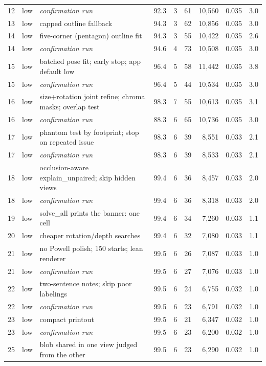 \begin{tabular}{@{}rlp{5.6cm}rrrrrr@{}}
12 & low & \emph{confirmation run} & 92.3 & 3 & 61 & 10,560 & 0.035 & 3.0 \\
13 & low & capped outline fallback & 94.3 & 3 & 62 & 10,856 & 0.035 & 3.0 \\
14 & low & five-corner (pentagon) outline fit & 94.3 & 3 & 55 & 10,422 & 0.035 & 2.6 \\
14 & low & \emph{confirmation run} & 94.6 & 4 & 73 & 10,508 & 0.035 & 3.0 \\
15 & low & batched pose fit; early stop; app default low & 96.4 & 5 & 58 & 11,442 & 0.035 & 3.8 \\
15 & low & \emph{confirmation run} & 96.4 & 5 & 44 & 10,534 & 0.035 & 3.0 \\
16 & low & size+rotation joint refine; chroma masks; overlap test & 98.3 & 7 & 55 & 10,613 & 0.035 & 3.1 \\
16 & low & \emph{confirmation run} & 88.3 & 6 & 65 & 10,736 & 0.035 & 3.0 \\
17 & low & phantom test by footprint; stop on repeated issue & 98.3 & 6 & 39 & 8,551 & 0.033 & 2.1 \\
17 & low & \emph{confirmation run} & 98.3 & 6 & 39 & 8,533 & 0.033 & 2.1 \\
18 & low & occlusion-aware explain\_unpaired; skip hidden views & 99.4 & 6 & 36 & 8,457 & 0.033 & 2.0 \\
18 & low & \emph{confirmation run} & 99.4 & 6 & 36 & 8,318 & 0.033 & 2.0 \\
19 & low & solve\_all prints the banner: one cell & 99.4 & 6 & 34 & 7,260 & 0.033 & 1.1 \\
20 & low & cheaper rotation/depth searches & 99.4 & 6 & 32 & 7,080 & 0.033 & 1.1 \\
21 & low & no Powell polish; 150 starts; lean renderer & 99.5 & 6 & 26 & 7,087 & 0.033 & 1.0 \\
21 & low & \emph{confirmation run} & 99.5 & 6 & 27 & 7,076 & 0.033 & 1.0 \\
22 & low & two-sentence notes; skip poor labelings & 99.5 & 6 & 24 & 6,755 & 0.032 & 1.0 \\
22 & low & \emph{confirmation run} & 99.5 & 6 & 23 & 6,791 & 0.032 & 1.0 \\
23 & low & compact printout & 99.5 & 6 & 21 & 6,347 & 0.032 & 1.0 \\
23 & low & \emph{confirmation run} & 99.5 & 6 & 23 & 6,200 & 0.032 & 1.0 \\
25 & low & blob shared in one view judged from the other & 99.5 & 6 & 23 & 6,290 & 0.032 & 1.0 \\
\bottomrule
\end{tabular}
